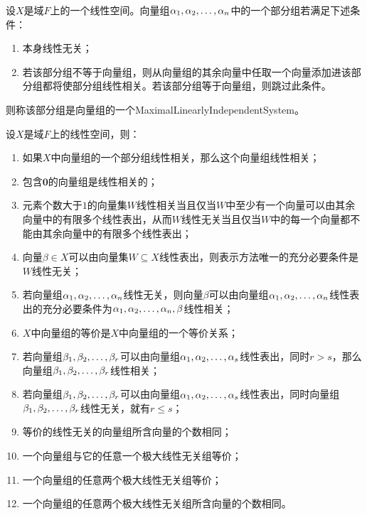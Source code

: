 \begin{definition}
	设$X$是域$F$上的一个线性空间。向量组$\alpha_1, \alpha_2, \dots, \alpha_{n}$中的一个部分组若满足下述条件：
	\begin{enumerate}
		\item 本身线性无关；
		\item 若该部分组不等于向量组，则从向量组的其余向量中任取一个向量添加进该部分组都将使部分组线性相关。若该部分组等于向量组，则跳过此条件。
	\end{enumerate}
	则称该部分组是向量组的一个\gls{MaximalLinearlyIndependentSystem}。
\end{definition}
\begin{property}\label{prop:LinearlyDependent}
	设$X$是域$F$上的线性空间，则：
	\begin{enumerate}
		\item 如果$X$中向量组的一个部分组线性相关，那么这个向量组线性相关；
		\item 包含$\mathbf{0}$的向量组是线性相关的；
		\item 元素个数大于$1$的向量集$W$线性相关当且仅当$W$中至少有一个向量可以由其余向量中的有限多个线性表出，从而$W$线性无关当且仅当$W$中的每一个向量都不能由其余向量中的有限多个线性表出；
		\item 向量$\beta\in X$可以由向量集$W\subseteq X$线性表出，则表示方法唯一的充分必要条件是$W$线性无关；
		\item 若向量组$\alpha_1, \alpha_2, \dots, \alpha_{n}$线性无关，则向量$\beta$可以由向量组$\alpha_1, \alpha_2, \dots, \alpha_{n}$线性表出的充分必要条件为$\alpha_1, \alpha_2, \dots, \alpha_{n},\beta$线性相关；
		\item $X$中向量组的等价是$X$中向量组的一个等价关系；
		\item 若向量组$\beta_1, \beta_2, \dots, \beta_{r}$可以由向量组$\alpha_1, \alpha_2, \dots, \alpha_{s}$线性表出，同时$r>s$，那么向量组$\beta_1, \beta_2, \dots, \beta_{r}$线性相关；
		\item 若向量组$\beta_1, \beta_2, \dots, \beta_{r}$可以由向量组$\alpha_1, \alpha_2, \dots, \alpha_{s}$线性表出，同时向量组$\beta_1, \beta_2, \dots, \beta_{r}$线性无关，就有$r\leqslant s$；
		\item 等价的线性无关的向量组所含向量的个数相同；
		\item 一个向量组与它的任意一个极大线性无关组等价；
		\item 一个向量组的任意两个极大线性无关组等价；
		\item 一个向量组的任意两个极大线性无关组所含向量的个数相同。
	\end{enumerate}
\end{property}
